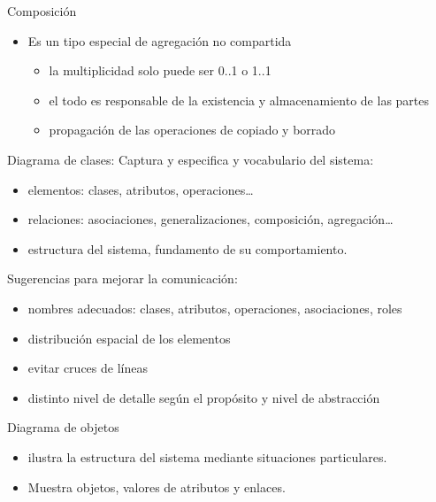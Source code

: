 \documentclass[12pt, twoside, openright]{report} %
\begin{document}
	Composición
	\begin{figure}[H]
		{\def\svgwidth{.7\textwidth}
  			 }
	\end{figure}
    \begin{itemize}
    
    \item
      Es un tipo especial de agregación no compartida

      \begin{itemize}
      
      \item
        la multiplicidad solo puede ser 0..1 o 1..1
      \item
        el todo es responsable de la existencia y almacenamiento de las
        partes
      \item
        propagación de las operaciones de copiado y borrado
      \end{itemize}
    \end{itemize}

	Diagrama de clases: Captura y especifica y vocabulario del sistema:

    \begin{itemize}
    
    \item
      elementos: clases, atributos, operaciones\ldots{}
    \item
      relaciones: asociaciones, generalizaciones, composición,
      agregación\ldots{}
    \item
      estructura del sistema, fundamento de su comportamiento.
    \end{itemize}
\pagebreak

    Sugerencias para mejorar la comunicación:

    \begin{itemize}
    
    \item
      nombres adecuados: clases, atributos, operaciones, asociaciones,
      roles
    \item
      distribución espacial de los elementos
    \item
      evitar cruces de líneas
    \item
      distinto nivel de detalle según el propósito y nivel de
      abstracción
    \end{itemize}

	Diagrama de objetos

    \begin{itemize}
    
    \item
      ilustra la estructura del sistema mediante situaciones
      particulares.
    \item
      Muestra objetos, valores de atributos y enlaces.
    \end{itemize}
  
\end{document}
